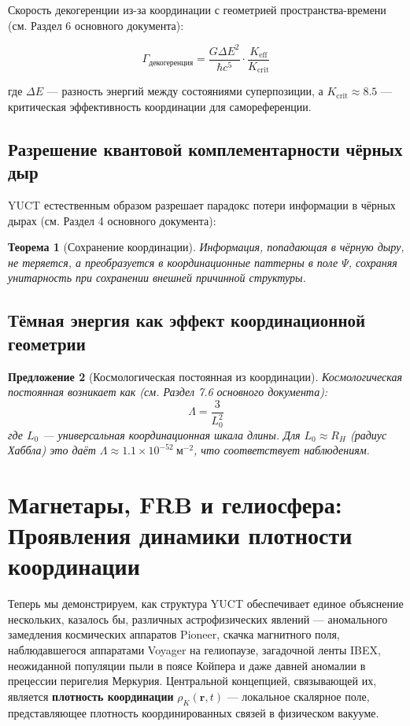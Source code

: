 \documentclass[12pt,a4paper]{article}
\newtheorem{theorem}{Теорема}[section]
\newtheorem{proposition}[theorem]{Предложение}
\theoremstyle{remark}
\newcommand{\Keff}{K_{\mathrm{eff}}}
\begin{document}
	Скорость декогеренции из-за координации с геометрией пространства-времени (см. Раздел 6 основного документа):
	
	\begin{equation}
		\Gamma_{\text{декогеренция}} = \frac{G \Delta E^2}{\hbar c^5} \cdot \frac{\Keff}{K_{\text{crit}}}
	\end{equation}
	
	где $\Delta E$ — разность энергий между состояниями суперпозиции, а $K_{\text{crit}} \approx 8.5$ — критическая эффективность координации для самореференции.
	
	\subsection{Разрешение квантовой комплементарности чёрных дыр}
	
	YUCT естественным образом разрешает парадокс потери информации в чёрных дырах (см. Раздел 4 основного документа):
	
	\begin{theorem}[Сохранение координации]
		Информация, попадающая в чёрную дыру, не теряется, а преобразуется в координационные паттерны в поле $\Psi$, сохраняя унитарность при сохранении внешней причинной структуры.
	\end{theorem}
	
	\subsection{Тёмная энергия как эффект координационной геометрии}
	
	\begin{proposition}[Космологическая постоянная из координации]
		Космологическая постоянная возникает как (см. Раздел 7.6 основного документа):
		\[
		\Lambda = \frac{3}{L_0^2}
		\]
		где $L_0$ — универсальная координационная шкала длины. Для $L_0 \approx R_H$ (радиус Хаббла) это даёт $\Lambda \approx 1.1 \times 10^{-52}\ \text{м}^{-2}$, что соответствует наблюдениям.
	\end{proposition}
	
	\section{Магнетары, FRB и гелиосфера: Проявления динамики плотности координации}
	\label{sec:coord_density}
	
	Теперь мы демонстрируем, как структура YUCT обеспечивает единое объяснение нескольких, казалось бы, различных астрофизических явлений — аномального замедления космических аппаратов Pioneer, скачка магнитного поля, наблюдавшегося аппаратами Voyager на гелиопаузе, загадочной ленты IBEX, неожиданной популяции пыли в поясе Койпера и даже давней аномалии в прецессии перигелия Меркурия. Центральной концепцией, связывающей их, является \textbf{плотность координации} $\rho_K(\mathbf{r},t)$ — локальное скалярное поле, представляющее плотность координированных связей в физическом вакууме.
	
\end{document}
